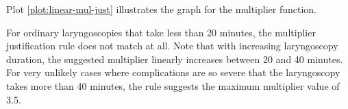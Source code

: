 Plot \ref{plot:linear-mul-just} illustrates the graph for the multiplier function.

For ordinary laryngoscopies that take less than 20 minutes, the multiplier justification rule does not match at all.
Note that with increasing laryngoscopy duration, the suggested multiplier linearly increases between 20 and 40 minutes.
For very unlikely cases where complications are so severe that the laryngoscopy takes more than 40 minutes, the rule suggests the maximum multiplier value of 3.5.

